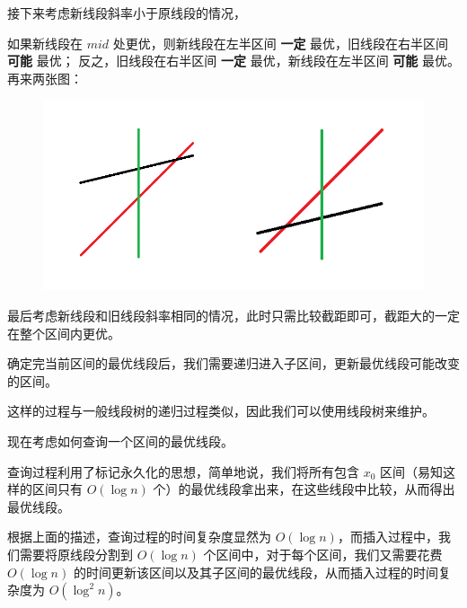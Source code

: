 	接下来考虑新线段斜率小于原线段的情况，

	如果新线段在 $mid$ 处更优，则新线段在左半区间 \textbf{一定} 最优，旧线段在右半区间 \textbf{可能} 最优；
	反之，旧线段在右半区间 \textbf{一定} 最优，新线段在左半区间 \textbf{可能} 最优。
	再来两张图：
	\begin{figure}[htbp]
		\centering
		\includegraphics[scale = 0.5]{./image/li-chao-tree2.png}
	\end{figure}
	
	最后考虑新线段和旧线段斜率相同的情况，此时只需比较截距即可，截距大的一定在整个区间内更优。
	
	确定完当前区间的最优线段后，我们需要递归进入子区间，更新最优线段可能改变的区间。
	
	这样的过程与一般线段树的递归过程类似，因此我们可以使用线段树来维护。
	
	现在考虑如何查询一个区间的最优线段。
	
	查询过程利用了标记永久化的思想，简单地说，我们将所有包含 $x_0$ 区间（易知这样的区间只有 $O(\log n)$ 个）的最优线段拿出来，在这些线段中比较，从而得出最优线段。
	
	根据上面的描述，查询过程的时间复杂度显然为 $O(\log n)$，而插入过程中，我们需要将原线段分割到 $O(\log n)$ 个区间中，对于每个区间，我们又需要花费 $O(\log n)$ 的时间更新该区间以及其子区间的最优线段，从而插入过程的时间复杂度为 $O(\log^2 n)$。
	
	